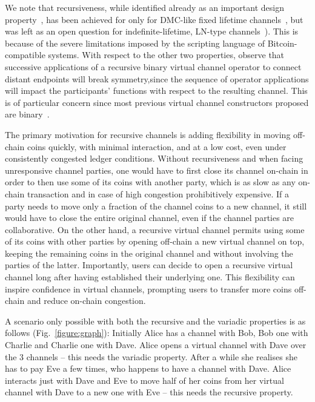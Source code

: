 We note that recursiveness, while identified already as an important design
property~\cite{DBLP:conf/ccs/DziembowskiFH18}, has been achieved for only for
DMC-like fixed lifetime channels~\cite{10.1007/978-3-030-65411-5_18}, but was
left as an open question for indefinite-lifetime, LN-type
channels~\cite{9519487}).
This is because of the severe limitations imposed by the scripting language of Bitcoin-compatible systems.
With respect to the other two properties, observe that successive applications
of a recursive binary virtual channel operator to connect distant endpoints will
break symmetry,since the sequence of operator applications will impact the
participants' functions with respect to the resulting channel. This is of
particular concern since most previous virtual channel constructors proposed are
binary~\cite{DBLP:conf/ccs/DziembowskiFH18,9519487,10.1007/978-3-030-65411-5_18}.

The primary motivation for recursive channels is adding flexibility in
moving off-chain coins quickly, with minimal interaction, and at a low cost, even
under consistently
congested ledger conditions. Without recursiveness and when facing
unresponsive channel parties, one would have to first
close its channel on-chain in order to then use some of its coins with
another party, which is as slow as any on-chain transaction and in case of high
congestion prohibitively expensive. If a party needs to move only a
fraction of the channel coins to a new channel, it still would have to close the
entire original channel, even if the channel parties are collaborative.
On the other hand, a
recursive
virtual channel permits using some of its coins with other parties by
opening off-chain a new virtual channel on top, keeping the remaining coins in
the original channel and without involving the parties of
the latter. Importantly, users can decide to open a recursive virtual channel
long after having established their underlying one. This flexibility can inspire confidence in virtual
channels, prompting users to transfer more coins off-chain and
reduce on-chain congestion.

A scenario only possible with both the recursive and the variadic
properties is as follows (Fig.~\ref{figure:graph}): Initially Alice has a channel with
Bob, Bob one with Charlie and Charlie one with Dave. Alice opens a virtual
channel with Dave over the $3$ channels -- this needs the variadic property.
After a while she realises she has to pay Eve a few
times, who happens to have a channel with Dave. Alice interacts just with
Dave and Eve to move half of her coins from her virtual channel with Dave to a
new one with Eve -- this needs the recursive property.

